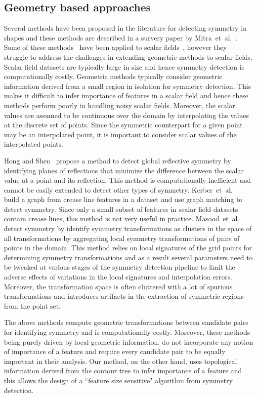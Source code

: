 \documentclass[review,journal]{vgtc}         %
\begin{document}
\subsection{Geometry based approaches}
Several methods have been proposed in the literature for detecting
symmetry in shapes and these methods are described in a survery paper by
Mitra~et~al.~\cite{}. Some of these methods~\cite{} have been applied to scalar fields~\cite{},
however they struggle to address the challenges in extending geometric methods to scalar fields.
Scalar field datasets are typically large in size and hence symmetry detection is computationally costly.
Geometric methods typically consider geometric information derived from a small region in isolation 
for symmetry detection. This makes it difficult to infer importance of 
features in a scalar field and hence these methods perform poorly in handling noisy scalar fields.  
Moreover, the scalar values are assumed to be continuous over the domain by interpolating the values at 
the discrete set of points. Since the symmetric counterpart for a given point may be an interpolated 
point, it is important to consider scalar values of the interpolated points.

Hong and Shen~\cite{} propose a method to detect global reflective symmetry by identifying planes
of reflections that minimize the difference between the scalar value at a point and its
reflection. This method is computationally inefficient and cannot be easily extended to detect 
other types of symmetry. Kerber~et~al.~\cite{} build a graph from crease line features in a dataset
and use graph matching to detect symmetry. Since only a small subset of features in scalar field datasets
contain crease lines, this method is not very useful in practice. Masood~et~al.\cite{} detect
symmetry by identify symmetry transformations as clusters in the space of all transformations
by aggregating local symmetry transformations of pairs of points in the domain. This method relies
on local signatures of the grid points for determining symmetry transformations and as a result
several parameters need to be tweaked at various stages of the symmetry detection pipeline
to limit the adverse effects of variations in the local signatures and interpolation errors.  
Moreover, the transformation space is often cluttered with a lot of spurious transformations 
and introduces artifacts in the extraction of symmetric regions from the point set. 

The above methods compute geometric transformations between candidate pairs for identifying
symmetry and is computationally costly. Moreover, these methods being purely driven by local geometric 
information, do not incorporate any notion of importance of a feature and require every candidate pair 
to be equally important in their analysis. Our method, on the other hand, uses topological
information derived from the contour tree to infer importance of a feature and this allows the
design of a ``feature size sensitive" algorithm from symmetry detection.
\end{document}
